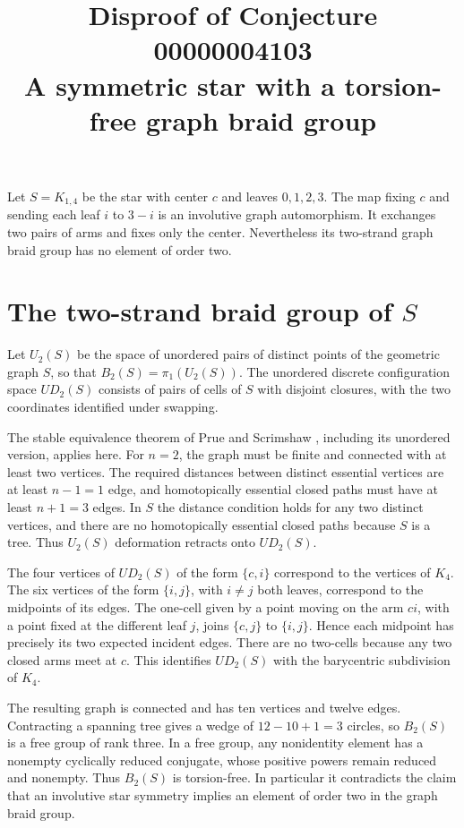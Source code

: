 \documentclass[11pt]{article}
\title{Disproof of Conjecture 00000004103\\
\large A symmetric star with a torsion-free graph braid group}
\author{}
\date{}
\begin{document}
\maketitle

Let \(S=K_{1,4}\) be the star with center \(c\) and leaves
\(0,1,2,3\). The map fixing \(c\) and sending each leaf \(i\) to
\(3-i\) is an involutive graph automorphism. It exchanges two pairs
of arms and fixes only the center. Nevertheless its two-strand
graph braid group has no element of order two.

\section*{The two-strand braid group of \(S\)}

Let \(U_2(S)\) be the space of unordered pairs of distinct points of
the geometric graph \(S\), so that \(B_2(S)=\pi_1(U_2(S))\). The
unordered discrete configuration space \(UD_2(S)\) consists of pairs
of cells of \(S\) with disjoint closures, with the two coordinates
identified under swapping.

The stable equivalence theorem of Prue and Scrimshaw
\cite[Theorem~3.2]{prue-scrimshaw}, including its unordered version,
applies here. For \(n=2\), the graph must be finite and connected
with at least two vertices. The required distances between distinct
essential vertices are at least \(n-1=1\) edge, and homotopically
essential closed paths must have at least \(n+1=3\) edges. In \(S\)
the distance condition holds for any two distinct vertices, and
there are no homotopically essential closed paths because \(S\) is
a tree. Thus \(U_2(S)\) deformation retracts onto \(UD_2(S)\).

The four vertices of \(UD_2(S)\) of the form \(\{c,i\}\) correspond
to the vertices of \(K_4\). The six vertices of the form \(\{i,j\}\),
with \(i\ne j\) both leaves, correspond to the midpoints of its edges.
The one-cell given by a point moving on the arm \(ci\), with a point
fixed at the different leaf \(j\), joins \(\{c,j\}\) to \(\{i,j\}\).
Hence each midpoint has precisely its two expected incident edges.
There are no two-cells because any two closed arms meet at \(c\).
This identifies \(UD_2(S)\) with the barycentric subdivision of \(K_4\).

The resulting graph is connected and has ten vertices and twelve
edges. Contracting a spanning tree gives a wedge of
\(12-10+1=3\) circles, so \(B_2(S)\) is a free group of rank three.
In a free group, any nonidentity element has a nonempty cyclically
reduced conjugate, whose positive powers remain reduced and nonempty.
Thus \(B_2(S)\) is torsion-free. In particular it contradicts the
claim that an involutive star symmetry implies an element of order
two in the graph braid group.
\end{document}
